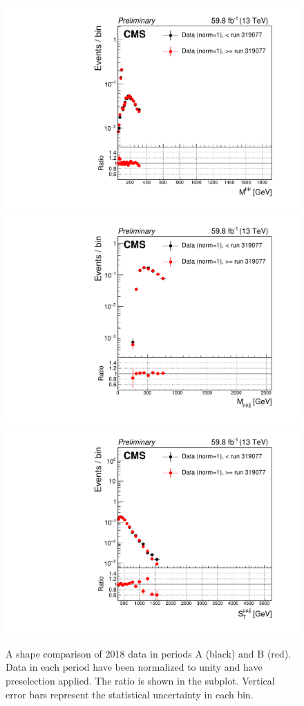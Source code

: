 \begin{figure}[H]
    \centering
    {\includegraphics[width=.49\textwidth]{Images/Analysis/Results_HEMFailureStudyPlots_Data_BeforeAfterRun319077/BasicLQ_uujj_M_uu_standard.pdf}}
    {\includegraphics[width=.49\textwidth]{Images/Analysis/Results_HEMFailureStudyPlots_Data_BeforeAfterRun319077/BasicLQ_uujj_M_uujj_standard.pdf}}
    {\includegraphics[width=.49\textwidth]{Images/Analysis/Results_HEMFailureStudyPlots_Data_BeforeAfterRun319077/BasicLQ_uujj_St_uujj_standard.pdf}}
    \caption{A shape comparison of 2018 data in periods A (black) and B (red). Data in each period have been normalized to unity and have preselection applied. The ratio \RatioDataAB is shown in the subplot. Vertical error bars represent the statistical uncertainty in each bin.}
    \label{figapp:hemMuuMuujjSt}
\end{figure}

